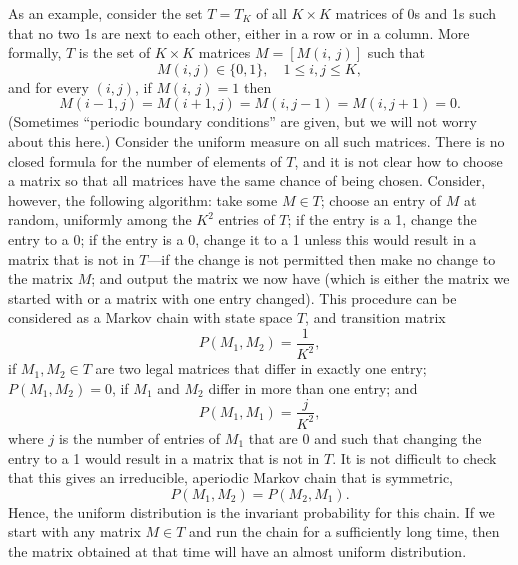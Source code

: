 \documentclass{stml-l}
\theoremstyle{definition}
\numberwithin{equation}{chapter}
\numberwithin{figure}{chapter}
\numberwithin{figure}{section}
\begin{document}
As an example, consider the set $T=T_{K}$ of all $K\times K$
matrices of 0s and 1s such that no two 1s are next to each other,
either in a row or in a column. More formally, $T$ is the set of
$K\times K$ matrices $M=[M(i,\,j)]$ such that
\begin{equation*}
M(i,j)\in\{0,1\},\quad 1\leq i,j\leq K,
\end{equation*}
and for every $(i,j)$, if $M(i,\,j)=1$ then
\begin{equation*}
M(i-1,j)=M(i+1,j)=M(i,j-1)=M(i,j+1)=0.
\end{equation*}
(Sometimes ``periodic boundary conditions'' are given, but we will
not worry about this here.) Consider the uniform measure on all such
matrices. There is no closed formula for the number of elements of
$T$, and it is not clear how to choose a matrix so that all matrices
have the same chance of being chosen. Consider, however, the
following algorithm: take some $M\in T$; choose an entry of $M$ at
random, uniformly among the $K^{2}$ entries of $T$; if the entry is
a 1, change the entry to a $0$; if the entry is a $0$, change it to
a 1 unless this would result in a matrix that is not in
$T$---if the change is not permitted then make no change to
the matrix $M$; and output the matrix we now have (which is either
the matrix we started with or a matrix with one entry changed). This
procedure can be considered as a Markov chain with state space $T$,
and transition matrix
\begin{equation*}
P(M_{1},M_{2})=\frac{1}{K^{2}},
\end{equation*}
if $M_{1},M_{2}\in T$ are two legal matrices that differ in exactly
one entry; $P(M_{1},M_{2})=0$, if $M_{1}$ and $M_{2}$ differ in more
than one entry; and
\begin{equation*}
P(M_{1},M_{1})=\frac{j}{K^{2}},
\end{equation*}
where $j$ is the number of entries of $M_{1}$ that are $0$ and such
that changing the entry to a 1 would result in a matrix that is not
in $T$. It is not difficult to check that this gives an irreducible,
aperiodic Markov chain that is symmetric,
\begin{equation*}
P(M_{1},M_{2})=P(M_{2},M_{1}).
\end{equation*}
Hence, the uniform distribution is the invariant probability for this
chain. If we start with any matrix $M\in T$ and run the chain for a
sufficiently long time, then the matrix obtained at that time will
have an almost uniform distribution.
\end{document}
